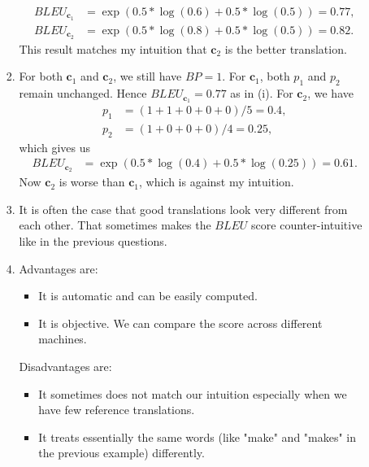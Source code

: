 \documentclass[12pt]{article}
\begin{document}
\begin{enumerate}[label=\textbf{\arabic*.}]
\begin{enumerate}[label=(\alph*)]
\begin{enumerate}[label=\roman*.]
\begin{align*}
        BLEU_{\bm{c}_1}&=\exp(0.5*\log(0.6)+0.5*\log(0.5))=0.77, \\
        BLEU_{\bm{c}_2}&=\exp(0.5*\log(0.8)+0.5*\log(0.5))=0.82.
      \end{align*}
      This result matches my intuition that $\bm{c}_2$ is the better translation.
      \item For both $\bm{c}_1$ and $\bm{c}_2$, we still have $BP=1$. For $\bm{c}_1$, both $p_1$ and $p_2$ remain unchanged. Hence $BLEU_{\bm{c}_1}=0.77$ as in (i). For $\bm{c}_2$, we have
      \begin{align*}
        p_1&=(1+1+0+0+0)/5=0.4, \\
        p_2&=(1+0+0+0)/4=0.25,
      \end{align*}
      which gives us
      \begin{align*}
        BLEU_{\bm{c}_2}&=\exp(0.5*\log(0.4)+0.5*\log(0.25))=0.61.
      \end{align*}
      Now $\bm{c}_2$ is worse than $\bm{c}_1$, which is against my intuition.
      \item It is often the case that good translations look very different from each other. That sometimes makes the $BLEU$ score
      counter-intuitive like in the previous questions.
      \item Advantages are:
      \begin{itemize}
        \item It is automatic and can be easily computed.
        \item It is objective. We can compare the score across different machines.
      \end{itemize}
      Disadvantages are:
      \begin{itemize}
        \item It sometimes does not match our intuition especially when we have few reference translations.
        \item It treats essentially the same words (like "make" and "makes" in the previous example) differently.
      \end{itemize}
    \end{enumerate}
  \end{enumerate}
\end{enumerate}
\end{document}
